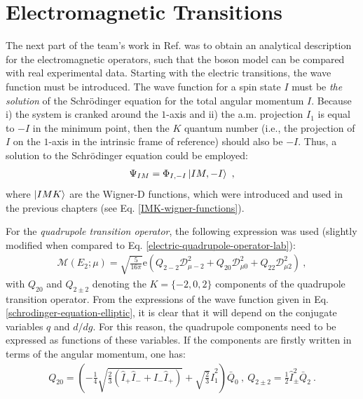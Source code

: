 \section{Electromagnetic Transitions}
\label{section-em-transitions-new-boson}

The next part of the team's work in Ref. \cite{raduta2020approach} was to obtain an analytical description for the electromagnetic operators, such that the boson model can be compared with real experimental data. Starting with the electric transitions, the wave function must be introduced. The wave function for a spin state $I$ must be \emph{the solution} of the Schrödinger equation for the total angular momentum $I$. Because i) the system is cranked around the $1$-axis and ii) the a.m. projection $I_1$ is equal to $-I$ in the minimum point, then the $K$ quantum number (i.e., the projection of $I$ on the $1$-axis in the intrinsic frame of reference) should also be $-I$. Thus, a solution to the Schrödinger equation could be employed:
\begin{align}
    \Psi_{IM}=\Phi_{I,-I}\ket{IM,-I}\ ,
\end{align}
where $\ket{IMK}$ are the Wigner-D functions, which were introduced and used in the previous chapters (see Eq. \ref{IMK-wigner-functions}).

For the \emph{quadrupole transition operator}, the following expression was used (slightly modified when compared to Eq. \ref{electric-quadrupole-operator-lab}):
\begin{align}
    \mathcal{M}\left(E_2;\mu\right)=\sqrt{\frac{5}{16\pi}}\mathrm{e}\left(Q_{2-2}\mathcal{D}_{\mu -2}^2+Q_{20}\mathcal{D}_{\mu 0}^2+Q_{22}\mathcal{D}_{\mu 2}^2\right)\ ,
\end{align}
with $Q_{20}$ and $Q_{2\pm2}$ denoting the $K=\{-2,0,2\}$ components of the quadrupole transition operator. From the expressions of the wave function given in Eq. \ref{schrodinger-equation-elliptic}, it is clear that it will depend on the conjugate variables $q$ and $d/dg$. For this reason, the quadrupole components need to be expressed as functions of these variables. If the components are firstly written in terms of the angular momentum, one has:
\begin{align}
    Q_{20}=\left(-\frac{1}{4}\sqrt{\frac{2}{3}\left(\hat{I}_+\hat{I}_-+\hat{I}_-\hat{I}_+\right)}+\sqrt{\frac{2}{3}}\hat{I}_1^2\right)\bar{Q}_0\ ,\ Q_{2\pm2}=\frac{1}{2}\hat{I}_\pm^2\bar{Q}_2\ .
\end{align}

